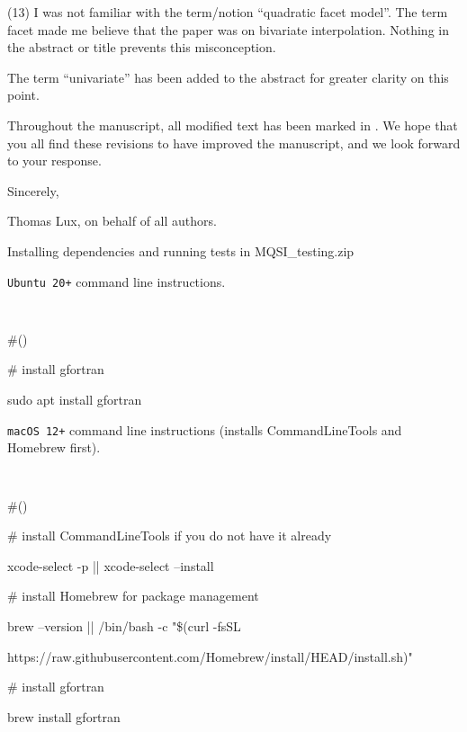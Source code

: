 \goodbreak
{\parindent=20pt \it
  
\item{(13)} I was not familiar with the term/notion ``quadratic facet
  model''. The term facet made me believe that the paper was on
  bivariate interpolation. Nothing in the abstract or title prevents
  this misconception.

}

The term ``univariate'' has been added to the abstract for greater
clarity on this point.

\vfill \eject

Throughout the manuscript, all modified text has been marked in
. We hope that you all find these revisions to have improved
the manuscript, and we look forward to your response.

Sincerely,

Thomas Lux, on behalf of all authors.

\vfill

{\headingbf Installing dependencies and running tests in} {\hskip 2mm} {\headingtt MQSI\_testing.zip}

\vskip 3mm

{\tt Ubuntu 20+} command line instructions.

{\parskip=2pt \parindent=20pt \tt
\item{} \#() 
\item{} \textMaroon \# install gfortran \textBlack
\item{} sudo apt install gfortran
}

\vskip 3mm

{\tt macOS 12+} command line instructions (installs CommandLineTools and Homebrew first).

{\parskip=2pt \parindent=20pt \tt
\item{} \#() 
\item{} \textMaroon \# install CommandLineTools if you do not have it already \textBlack
\item{} xcode-select -p || xcode-select --install
\item{} \textMaroon \# install Homebrew for package management \textBlack
\item{} brew --version || /bin/bash -c "\$(curl -fsSL $ $
\item{} \hskip 10mm https://raw.githubusercontent.com/Homebrew/install/HEAD/install.sh)"
\item{} \textMaroon \# install gfortran \textBlack
\item{} brew install gfortran
}

